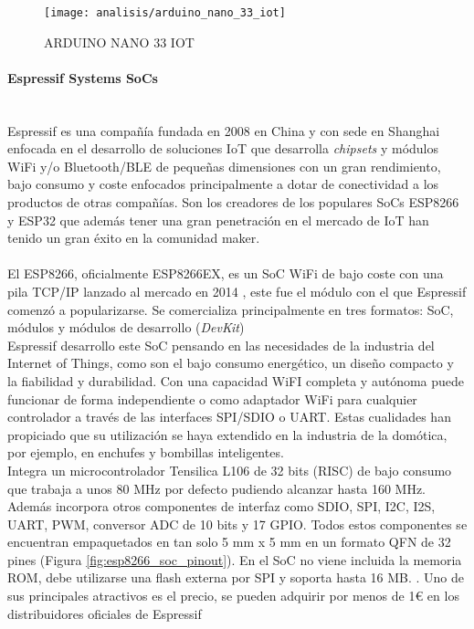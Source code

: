 \documentclass[../proyecto.tex]{subfiles}
\begin{document}
\begin{figure}[H]
\centering
\texttt{[image: analisis/arduino\_nano\_33\_iot]}
\caption{ARDUINO NANO 33 IOT}
\label{fig:arduino_nano_33_iot}
\end{figure}

\paragraph{Espressif Systems SoCs}\mbox{}\\
Espressif es una compañía fundada en 2008 en China y con sede en Shanghai enfocada en el desarrollo de soluciones IoT que desarrolla \textit{chipsets} y módulos WiFi y/o Bluetooth/BLE de pequeñas dimensiones con un gran rendimiento, bajo consumo y coste enfocados principalmente a dotar de conectividad a los productos de otras compañías. Son los creadores de los populares SoCs ESP8266 y ESP32 que además tener una gran penetración en el mercado de IoT han tenido un gran éxito en la comunidad maker.\\

\\

El ESP8266, oficialmente ESP8266EX, es un SoC WiFi de bajo coste con una pila TCP/IP lanzado al mercado en 2014 \cite{esp8266_overview}, este fue el módulo con el que Espressif comenzó a popularizarse. Se comercializa principalmente en tres formatos: SoC, módulos y módulos de desarrollo (\textit{DevKit})\\

Espressif desarrollo este SoC pensando en las necesidades de la industria del Internet of Things, como son el bajo consumo energético, un diseño compacto y la fiabilidad y durabilidad. Con una capacidad WiFI completa y autónoma puede funcionar de forma independiente o como adaptador WiFi para cualquier controlador a través de las interfaces SPI/SDIO o UART. Estas cualidades han propiciado que su utilización se haya extendido en la industria de la domótica, por ejemplo, en enchufes y bombillas inteligentes. \\

Integra un microcontrolador Tensilica L106 de 32 bits (RISC) de bajo consumo que trabaja a unos 80 MHz por defecto pudiendo alcanzar hasta 160 MHz. Además incorpora otros componentes de interfaz como SDIO, SPI, I2C, I2S, UART, PWM, conversor ADC de 10 bits y 17 GPIO. Todos estos componentes se encuentran empaquetados en tan solo 5 mm x 5 mm en un formato QFN de 32 pines (Figura \ref{fig:esp8266_soc_pinout}). En el SoC no viene incluida la memoria ROM, debe utilizarse una flash externa por SPI y soporta hasta 16 MB. \cite{esp8266_datasheet}. Uno de sus principales atractivos es el precio, se pueden adquirir por menos de 1€ en los distribuidores oficiales de Espressif \cite{espressif_provider_digikey} \cite{espressif_provider_mouser}\\
\end{document}
